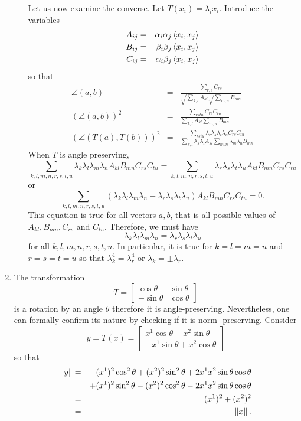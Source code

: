 \begin{enumerate}
\begin{enumerate}
Let us now examine the converse. Let $T(x_i) = \lambda_i x_i$. Introduce the
variables
\begin{eqnarray*}
A_{ij} &=& \alpha_i\alpha_j\left\langle{x_i, x_j}\right\rangle \\
B_{ij} &=& \beta_i\beta_j\left\langle{x_i, x_j}\right\rangle \\
C_{ij} &=& \alpha_i\beta_j\left\langle{x_i, x_j}\right\rangle
\end{eqnarray*}
so that
\begin{eqnarray*}
\angle(a, b) &=& \frac{\sum_{r,s}C_{rs}}
                 {\sqrt{\sum_{k,l}A_{kl}}\sqrt{\sum_{m,n}B_{mn}}} \\
(\angle(a, b))^2 &=& \frac{\sum_{rstu}C_{rs}C_{tu}}
                 {\sum_{k,l}A_{kl}\sum_{m,n}B_{mn}}  \\
(\angle(T(a), T(b)))^2 &=& \frac{\sum_{rstu}\lambda_r\lambda_s\lambda_t\lambda_u
    C_{rs}C_{tu}}
    {\sum_{k,l}\lambda_k\lambda_l A_{kl}\sum_{m,n}\lambda_m\lambda_n B_{mn}} 
\end{eqnarray*}
When $T$ is angle preserving,
\[
\sum_{k,l,m,n,r,s,t,u}\lambda_k\lambda_l\lambda_m\lambda_n A_{kl}B_{mn}C_{rs}
C_{tu} = 
\sum_{k,l,m,n,r,s,t,u}\lambda_r\lambda_s\lambda_t\lambda_u A_{kl}B_{mn}C_{rs}
C_{tu}
\]
or
\[
\sum_{k,l,m,n,r,s,t,u}(\lambda_k\lambda_l\lambda_m\lambda_n - 
\lambda_r\lambda_s\lambda_t\lambda_u)A_{kl}B_{mn}C_{rs}C_{tu} = 0.
\]
This equation is true for all vectors $a, b$, that is all possible values of 
$A_{kl}, B_{mn}, C_{rs}$ and $C_{tu}$. Therefore, we must have
\[
\lambda_k\lambda_l\lambda_m\lambda_n = \lambda_r\lambda_s\lambda_t\lambda_u
\]
for all $k, l, m, n, r, s, t, u$. In particular, it is true for $k = l = m = n$
and $r = s = t = u$ so that $\lambda_k^4 = \lambda_r^4$ or $\lambda_k = \pm
\lambda_r$.
\end{enumerate}

\item The transformation
\[
T = \begin{bmatrix}\cos\theta&\sin\theta\\-\sin\theta&\cos\theta\end{bmatrix}
\]
is a rotation by an angle $\theta$ therefore it is angle-preserving. 
Nevertheless, one can formally confirm its nature by checking if it is norm-
preserving. Consider 
\[
y = T(x) = \begin{bmatrix}x^1\cos\theta + x^2\sin\theta \\ 
-x^1\sin\theta + x^2\cos\theta\end{bmatrix}
\]
so that
\begin{eqnarray*}
\left\Vert{y}\right\Vert &=& (x^1)^2\cos^2\theta + (x^2)^2\sin^2\theta + 2x^1x^2\sin\theta
\cos\theta \\
 & & + (x^1)^2\sin^2\theta + (x^2)^2\cos^2\theta - 2x^1x^2\sin\theta
\cos\theta \\
 &=& (x^1)^2 + (x^2)^2 \\
 &=&  \left\Vert{x}\right\Vert.
\end{eqnarray*}


\end{enumerate}
